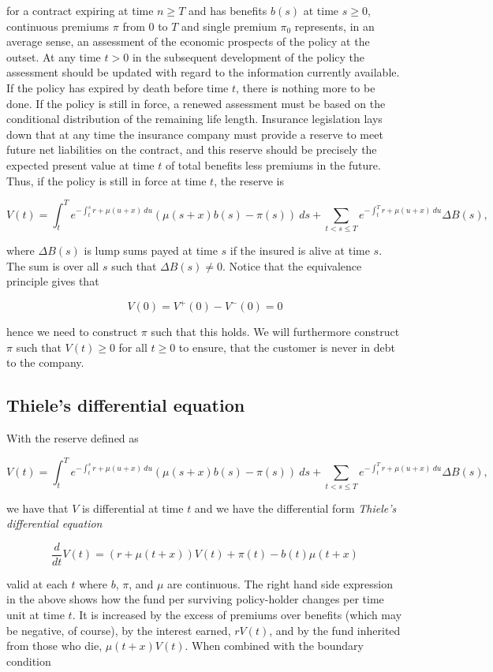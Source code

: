 \documentclass[a4paper,10pt,openany]{book}
\begin{document}
for a contract expiring at time \(n\ge T\) and has benefits \(b(s)\) at time \(s\ge 0\), continuous premiums \(\pi\) from 0 to \(T\) and single premium \(\pi_0\) represents, in an average sense, an assessment of the economic prospects of the policy at the outset. At any time \(t > 0\) in the subsequent development of the policy the assessment should be updated with regard to the information currently available. If the policy has expired by death before time \(t\), there is nothing more to be done. If the policy is still in force, a renewed assessment must be based on the conditional distribution of the remaining life length. Insurance legislation lays down that at any time the insurance company must provide a reserve to meet future net liabilities on the contract, and this reserve should be precisely the expected present value at time \(t\) of total benefits less premiums in the future. Thus, if the policy is still in force at time \(t\), the reserve is

\[
V(t)=\int_t^T e^{-\int_t^s r+\mu(u+x)\ du}(\mu(s+x)b(s)-\pi(s))\ ds+\sum_{t<s\le T}e^{-\int_t^Tr+\mu(u+x)\ du}\Delta B(s),
\]

where \(\Delta B(s)\) is lump sums payed at time \(s\) if the insured is alive at time \(s\). The sum is over all \(s\) such that \(\Delta B(s)\ne 0\). Notice that the equivalence principle gives that

\[
V(0)=V^+(0)-V^-(0)=0
\]

hence we need to construct \(\pi\) such that this holds. We will furthermore construct \(\pi\) such that \(V(t)\ge 0\) for all \(t\ge 0\) to ensure, that the customer is never in debt to the company.

\hypertarget{thieles-differential-equation}{%
\subsection{Thiele's differential equation}\label{thieles-differential-equation}}

With the reserve defined as

\[
V(t)=\int_t^T e^{-\int_t^s r+\mu(u+x)\ du}(\mu(s+x)b(s)-\pi(s))\ ds+\sum_{t<s\le T}e^{-\int_t^Tr+\mu(u+x)\ du}\Delta B(s),
\]

we have that \(V\) is differential at time \(t\) and we have the differential form \emph{Thiele's differential equation}

\[
\frac{d}{dt}V(t)=(r+\mu(t+x))V(t)+\pi(t)-b(t)\mu(t+x)
\]

valid at each \(t\) where \(b\), \(\pi\), and \(\mu\) are continuous. The right hand side expression in the above shows how the fund per surviving policy-holder changes per time unit at time \(t\). It is increased by the excess of premiums over benefits (which may be negative, of course), by the interest earned, \(rV(t)\), and by the fund inherited from those who die, \(\mu(t+x) V(t)\). When combined with the boundary condition
\end{document}
